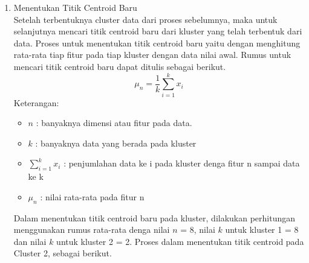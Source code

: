 \documentclass[english,12pt,a4paper,openany]{book}
\begin{document}
\begin{enumerate}
		\newpage
		\item Menentukan Titik Centroid Baru\\
		Setelah terbentuknya cluster data dari proses sebelumnya, maka untuk selanjutnya mencari titik centroid baru dari kluster yang telah terbentuk dari data. Proses untuk menentukan titik centroid baru yaitu dengan menghitung rata-rata tiap fitur pada tiap kluster dengan data nilai awal. Rumus untuk mencari titik centroid baru dapat ditulis sebagai berikut.
		\[
		\mu_n = \frac{1}{k} \sum_{i=1}^k x_i
		\]
		Keterangan:
		\begin{itemize}
			\item \( n \) : banyaknya dimensi atau fitur pada data.
			\item \( k \) : banyaknya data yang berada pada kluster
			\item \( \sum_{i=1}^k x_i \) : penjumlahan data ke i pada kluster denga fitur n sampai data ke k 
			\item \( \mu_n \) : nilai rata-rata pada fitur n
		\end{itemize}
		
		Dalam menentukan titik centroid baru pada kluster, dilakukan perhitungan menggunakan rumus rata-rata denga nilai \( n \) = 8, nilai \(k\) untuk kluster 1 = 8 dan nilai \(k\) untuk kluster 2 = 2. Proses dalam menentukan titik centroid pada Cluster 2, sebagai berikut.\\
		

\end{enumerate}
\end{document}
